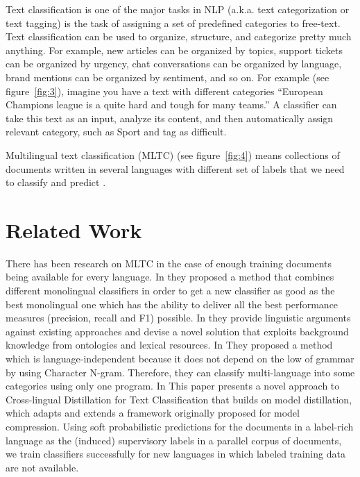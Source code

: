 \documentclass[letterpaper,12pt]{article}
\begin{document}
Text classification is one of the major tasks in NLP (a.k.a. text categorization or text tagging) is the task of assigning a set of predefined categories to free-text. Text classification can be used to organize, structure, and categorize pretty much anything. For example, new articles can be organized by topics, support tickets can be organized by urgency, chat conversations can be organized by language, brand mentions can be organized by sentiment, and so on. For example (see figure~\ref{fig:3}), imagine you have a text with different categories “European Champions league is a quite hard and tough for many teams.” A classifier can take this text as an input, analyze its content, and then automatically assign relevant category, such as Sport and tag as difficult. 

Multilingual text classification (MLTC) (see figure~\ref{fig:4}) means collections of documents written in several languages with different set of labels that we need to classify and predict \cite{Teresa_Gonalves}. 


\section{Related Work}
There has been research on MLTC in the case of enough training documents being available for every language. In \cite{Teresa_Gonalves} they proposed a method that combines different monolingual classifiers in order to get a new classifier as good as the best monolingual one which has the ability to deliver all the best performance measures (precision, recall and F1) possible. In \cite{delmo} they provide linguistic arguments against existing approaches and devise a novel solution that exploits background knowledge from ontologies and lexical resources. In \cite{Makoto} They proposed a method which is language-independent because it does not depend on the low of grammar by using Character N-gram. Therefore, they can classify multi-language into some categories using only one program. In \cite{Ruochen} This paper presents a novel approach to Cross-lingual Distillation for Text Classification that builds on model distillation, which adapts and extends a framework originally proposed for model compression. Using soft probabilistic predictions for the documents in a label-rich language as the (induced) supervisory labels in a parallel corpus of documents, we train classifiers successfully for new languages in which labeled training data are not available.
\end{document}

